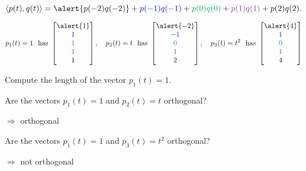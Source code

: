 \documentclass[xcolor=dvipsnames,aspectratio=169,t]{beamer}
\begin{document}
\begin{frame}
  \[ \langle p(t) , q(t) \rangle = \alert{p(-2)q(-2)} + \colorb{p(-1)q(-1)} + \colorg{p(0)q(0)}+\colorp{p(1)q(1)}+p(2)q(2) .\]

  \[ p_1(t)=1 \mbox{\ \ has } \begin{bmatrix} \alert{1} \\ \colorb{1} \\ \colorg{1} \\ \colorp{1} \\ 1 \end{bmatrix}, \quad 
  p_2(t)=t \mbox{\ \ has } \begin{bmatrix} \alert{-2} \\ \colorb{-1} \\ \colorg{0} \\ \colorp{1} \\ 2 \end{bmatrix}, \quad
  p_3(t)=t^2 \mbox{\ \ has } \begin{bmatrix} \alert{4} \\ \colorb{1} \\ \colorg{0} \\ \colorp{1} \\ 4 \end{bmatrix} \]

  \bb
  \pause
  \ii Compute the length of the vector $p_1(t) = 1$. \smallskip
  
  \pause\qquad{} \ms
  
  \pause
  \ii Are the vectors $p_1(t)=1$ and $p_2(t) = t$ orthogonal? \smallskip
  
  \pause\qquad{} \quad $\Rightarrow$ \alert{orthogonal} \ms
  
  \pause
  \ii Are the vectors $p_1(t)=1$ and $p_3(t) = t^2$ orthogonal? \smallskip
  
  \pause\qquad{} \quad $\Rightarrow$ \alert{not} orthogonal
  \ee
\end{frame}
\end{document}
